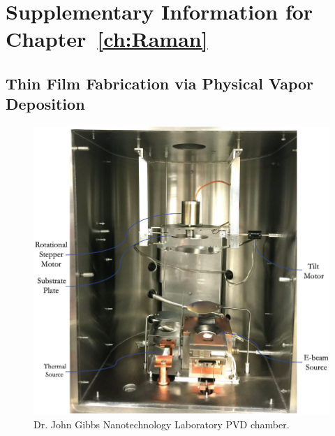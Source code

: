 \chapter{Supplementary Information for Chapter~\ref{ch:Raman}}
\label{appendix: Raman}
\acresetall

\section{Thin Film Fabrication via Physical Vapor Deposition}
\label{Raman:Appendix:sec:ThinFilmFabricationViaPVD}

\begin{figure}[t]
  \centering
  \includegraphics[width=\textwidth]{figs/4-Raman/DepositionChamber.png}
  \caption{Dr. John Gibbs Nanotechnology Laboratory \ac{PVD} chamber.}
  \label{fig:Raman:DepositionChamber}
\end{figure}

